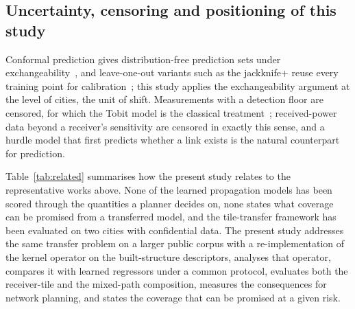 \subsection{Uncertainty, censoring and positioning of this study}
Conformal prediction gives distribution-free prediction sets under
exchangeability~\cite{vovk2005}, and leave-one-out variants such as the
jackknife+ reuse every training point for calibration~\cite{barber2021};
this study applies the exchangeability argument at the level of cities, the
unit of shift. Measurements with a detection floor are censored, for which
the Tobit model is the classical treatment~\cite{tobin1958}; received-power
data beyond a receiver's sensitivity are censored in exactly this sense, and
a hurdle model that first predicts whether a link exists is the natural
counterpart for prediction.

Table~\ref{tab:related} summarises how the present study relates to the
representative works above. None of the learned propagation models has been
scored through the quantities a planner decides on, none states what
coverage can be promised from a transferred model, and the tile-transfer
framework has been evaluated on two cities with confidential data. The
present study addresses the same transfer problem on a larger public corpus
with a re-implementation of the kernel operator on the built-structure
descriptors, analyses that operator, compares it with learned regressors
under a common protocol, evaluates both the receiver-tile and the mixed-path
composition, measures the consequences for network planning, and states the
coverage that can be promised at a given risk.

